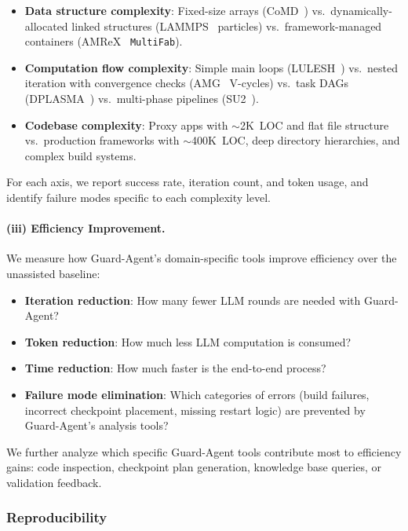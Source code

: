 \begin{itemize}
    \item \textbf{Data structure complexity}: Fixed-size arrays (CoMD~\cite{comd}) vs.\ dynamically-allocated linked structures (LAMMPS~\cite{lammps} particles) vs.\ framework-managed containers (AMReX~\cite{amrex} \texttt{MultiFab}).
    \item \textbf{Computation flow complexity}: Simple main loops (LULESH~\cite{lulesh}) vs.\ nested iteration with convergence checks (AMG~\cite{amg} V-cycles) vs.\ task DAGs (DPLASMA~\cite{dplasma}) vs.\ multi-phase pipelines (SU2~\cite{su2}).
    \item \textbf{Codebase complexity}: Proxy apps with ${\sim}$2K~LOC and flat file structure vs.\ production frameworks with ${\sim}$400K~LOC, deep directory hierarchies, and complex build systems.
\end{itemize}

For each axis, we report success rate, iteration count, and token usage, and identify failure modes specific to each complexity level.

\paragraph{(iii) Efficiency Improvement.}
We measure how Guard-Agent's domain-specific tools improve efficiency over the unassisted baseline:

\begin{itemize}
    \item \textbf{Iteration reduction}: How many fewer LLM rounds are needed with Guard-Agent?
    \item \textbf{Token reduction}: How much less LLM computation is consumed?
    \item \textbf{Time reduction}: How much faster is the end-to-end process?
    \item \textbf{Failure mode elimination}: Which categories of errors (build failures, incorrect checkpoint placement, missing restart logic) are prevented by Guard-Agent's analysis tools?
\end{itemize}

We further analyze which specific Guard-Agent tools contribute most to efficiency gains: code inspection, checkpoint plan generation, knowledge base queries, or validation feedback.

\subsubsection{Reproducibility}
\label{sec:reproducibility}

